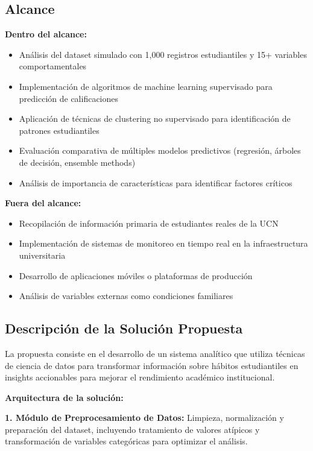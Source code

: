 \documentclass[12pt,letterpaper]{report}
\begin{document}
\subsection{Alcance}
\textbf{Dentro del alcance:}
\begin{itemize}
\item Análisis del dataset simulado con 1,000 registros estudiantiles y 15+ variables comportamentales
\item Implementación de algoritmos de machine learning supervisado para predicción de calificaciones
\item Aplicación de técnicas de clustering no supervisado para identificación de patrones estudiantiles
\item Evaluación comparativa de múltiples modelos predictivos (regresión, árboles de decisión, ensemble methods)
\item Análisis de importancia de características para identificar factores críticos
\end{itemize}
\textbf{Fuera del alcance:}
\begin{itemize}
\item Recopilación de información primaria de estudiantes reales de la UCN
\item Implementación de sistemas de monitoreo en tiempo real en la infraestructura universitaria
\item Desarrollo de aplicaciones móviles o plataformas de producción
\item Análisis de variables externas como condiciones familiares
\end{itemize}

\subsection{Descripción de la Solución Propuesta}
La propuesta consiste en el desarrollo de un sistema analítico que utiliza técnicas de ciencia de datos para transformar 
información sobre hábitos estudiantiles en insights accionables para mejorar el rendimiento académico institucional.
\vspace{0.3cm}

\textbf{Arquitectura de la solución:}

\vspace{0.3cm}
\textbf{1. Módulo de Preprocesamiento de Datos:} Limpieza, normalización y preparación del dataset, incluyendo tratamiento de valores atípicos y transformación de variables categóricas para optimizar el análisis.
\vspace{0.3cm}
\end{document}
